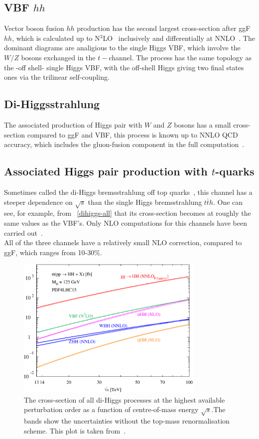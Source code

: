 \subsection{VBF $hh$}
Vector boson fusion $hh$ production has the second largest cross-section after ggF $hh$, which is calculated up to N$^3$LO~\cite{Baglio:2012np,Ling:2014sne,Dreyer:2018qbw} inclusively and differentially at NNLO~\cite{Dreyer:2018rfu}. The dominant diagrams are analigious to the single Higgs VBF, which involve the $W/Z$ bosons exchanged in the $t-$channel. The process has the same topology as the -off shell- single Higgs VBF, with the off-shell Higgs giving two final states ones via the trilinear self-coupling. 
\subsection{Di-Higgsstrahlung}
The associated production of Higgs pair with $W$ and $Z$ bosons has a small cross-section compared to ggF and VBF,  this process is known up to NNLO QCD accuracy, which includes the gluon-fusion component in the full computation~\cite{Li:2016nrr,Li:2017lbf}. 
\subsection{Associated Higgs pair production with $t$-quarks}
Sometimes called the di-Higgs bremsstrahlung off top quarks~\cite{DiMicco:2019ngk}, this channel has a steeper dependence on $\sqrt{s}$ than the single Higgs bremsstrahlung $t\bar t h$. One can see, for example, from ~\autoref{dihiggs-all} that its cross-section becomes at  roughly the same  values as the VBF's. Only NLO computations for this channels have been carried out~\cite{Frederix:2014hta}. \\ All of the three channels have a relatively small NLO correction, compared to ggF, which ranges from 10-30\%. 
\begin{figure}[!htpb]
	\centering
	\includegraphics[width = 0.8\textwidth]{./figures/cxn_HH}
	\caption{The cross-section of all di-Higgs processes at the highest available perturbation order as a function of centre-of-mass energy $\sqrt{s}$.The bands show the uncertainties without the top-mass renormalisation scheme. This plot is taken from~\cite{DiMicco:2019ngk}.} 
	\label{dihiggs-all}
\end{figure}
%

